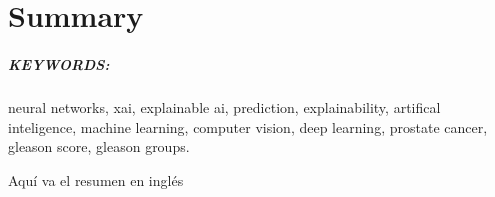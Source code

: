 %

\chapter{Summary}
\paragraph*{KEYWORDS:} neural networks, xai, explainable ai, prediction, explainability, artifical inteligence, machine learning, computer vision, deep learning, prostate cancer, gleason score, gleason groups.  

Aquí va el resumen en inglés
\thispagestyle{empty}


\endinput
